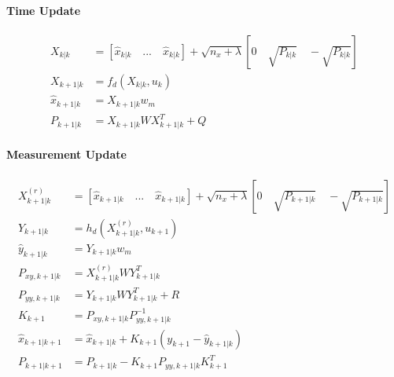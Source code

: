 	\paragraph{Time Update}
	\begin{equation}
		\begin{split}
			X_{k|k} &= [\hat{x}_{k|k}\quad ...\quad \hat{x}_{k|k}]+\sqrt{n_x + \lambda}[0\quad \sqrt{P_{k|k}}\quad -\sqrt{P_{k|k}}]\\
			X_{k+1|k} &= f_d(X_{k|k},u_k)\\
			\hat{x}_{k+1|k} &= X_{k+1|k}w_m\\
			P_{k+1|k} &= X_{k+1|k}WX^T_{k+1|k} + Q
		\end{split}
		\label{kfeq10}
	\end{equation}
	\paragraph{Measurement Update}
	\begin{equation}
		\begin{split}
			X^{(r)}_{k+1|k} &= [\hat{x}_{k+1|k}\quad ...\quad \hat{x}_{k+1|k}]+\sqrt{n_x + \lambda}[0\quad \sqrt{P_{k+1|k}}\quad -\sqrt{P_{k+1|k}}]\\
			Y_{k+1|k} &= h_d(X^{(r)}_{k+1|k},u_{k+1})\\
			\hat{y}_{k+1|k} &= Y_{k+1|k} w_m\\
			P_{xy,k+1|k} &= X^{(r)}_{k+1|k}WY^T_{k+1|k}\\
			P_{yy,k+1|k} &= Y_{k+1|k}WY^T_{k+1|k} + R \\
			K_{k+1} &= P_{xy,k+1|k}P^{-1}_{yy,k+1|k}\\
			\hat{x}_{k+1|k+1} &= \hat{x}_{k+1|k} + K_{k+1}(y_{k+1}-\hat{y}_{k+1|k})\\
			P_{k+1|k+1} &= P_{k+1|k} - K_{k+1}P_{yy,k+1|k}K^T_{k+1}
		\end{split}
		\label{kfeq11}
	\end{equation}